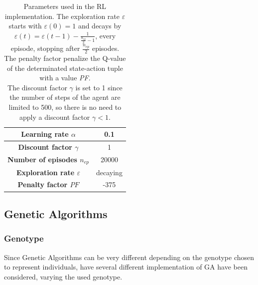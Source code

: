 \begin{table}[htb]%
	\centering
	\label{tab:RL_parameters}
	\begin{tabular}{|S|S|} 		%
		
		\hline
		{\textbf{Learning rate $\alpha$}} &  {0.1} \\
		\hline
		{\textbf{Discount factor $\gamma$}} & {1} \\
		\hline
		{\textbf{Number of episodes $n_{ep}$}} & {20000} \\
		\hline
		{\textbf{Exploration rate $\varepsilon$}}  & {decaying} \\
		\hline
		{\textbf{Penalty factor $PF$}}& {-375} \\
		\hline
		
	\end{tabular}
	\caption{Parameters used in the RL implementation. The exploration rate $\varepsilon$ starts with $\varepsilon(0)=1$ and decays by $\varepsilon(t) = \varepsilon(t - 1) - \frac{1}{\frac{n_{ep}}{2} - 1}$, every episode, stopping after $\frac{n_{ep}}{2}$ episodes. \\
	The penalty factor penalize the Q-value of the determinated state-action tuple with a value \textit{PF}.\\
	The discount factor $\gamma$ is set to 1 since the number of steps of the agent are limited to 500, so there is no need to apply a discount factor $\gamma < 1$.
	}
\end{table}



\subsection{Genetic Algorithms}

\subsubsection{Genotype}
Since Genetic Algorithms can be very different depending on the genotype chosen to represent individuals, have  several different implementation of GA have been considered, varying the used genotype.
\\


